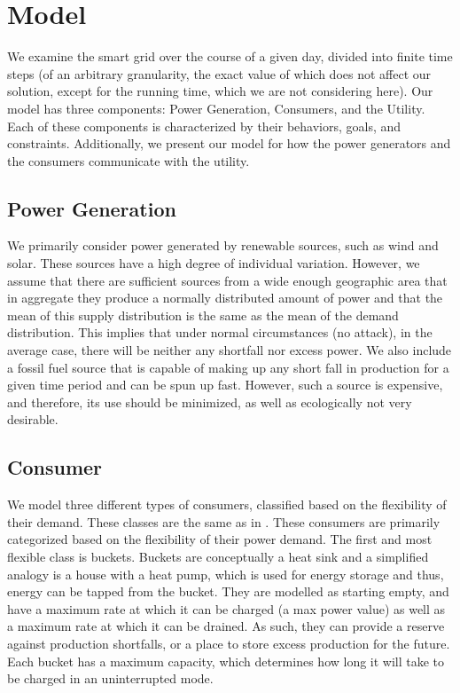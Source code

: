 \documentclass[conference]{IEEEtran}
\begin{document}
\section{Model}
\label{Model}

We examine the smart grid over the course of a given day, divided into finite time steps (of an arbitrary granularity, the exact value of which does not affect our solution, except for the running time, which we are not considering here). Our model has three components: Power Generation, Consumers, and the Utility. Each of these components is characterized by their behaviors, goals, and constraints. Additionally, we present our model for how the power generators and the consumers communicate with the utility. 

\subsection{Power Generation}
\label{Power Generation}

We primarily consider power generated by renewable sources, such as wind and solar. These sources have a high degree of individual variation. However, we assume that there are sufficient sources from a wide enough geographic area that in aggregate they produce a normally distributed amount of power and that the mean of this supply distribution is the same as the mean of the demand distribution. This implies that under normal circumstances (no attack), in the average case, there will be neither any shortfall nor excess power. We also include a fossil fuel source that is capable of making up any short fall in production for a given time period and can be spun up fast. However, such a source is expensive, and therefore, its use should be minimized, as well as ecologically not very desirable. 

\subsection{Consumer}
\label{Consumer}

We model three different types of consumers, classified based on the flexibility of their demand. These classes are the same as in \cite{petersen2013taxonomy}. These consumers are primarily categorized based on the flexibility of their power demand. 
The first and most flexible class is buckets. Buckets are conceptually a heat sink and 
a simplified analogy is a house with a heat pump, which is used for energy storage and thus, energy can be tapped from the bucket. They are modelled as starting empty, and have a maximum rate at which it can be charged (a max power value) as well as a maximum rate at which it can be drained. As such, they can provide a reserve against production shortfalls, or a place to store excess production for the future. Each bucket has a maximum capacity, which determines how long it will take to be charged in an uninterrupted mode. 
\end{document}
